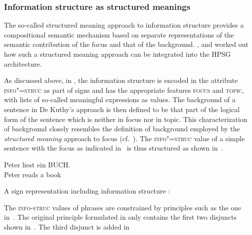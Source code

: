 \documentclass[output=paper
 	        ,biblatex
                ,babelshorthands
                ,newtxmath
                ,draftmode
                ,colorlinks, citecolor=brown
]{langscibook}
\begin{document}
\subsubsection{Information structure as structured meanings \citep{deKuthy2002a}}
\label{sec:struc-meaning}
The so-called structured meaning approach to information structure
\citep{Stechow81a-u,Jacobs83a,Krifka92a-u-kopiert} provides a
compositional semantic mechanism based on separate representations of
the semantic contribution of the focus and that of the
background. \citet{deKuthy2002a}, \cite{dKM2003a} and
\cite{Webelhuth2007a-u} worked out how such a structured meaning
approach can be integrated into the HPSG architecture.

As discussed above, in \cite{deKuthy2002a}, the information structure
is encoded in the attribute \textsc{info"=struc} as part of signs and
has the appropriate features \textsc{focus} and \textsc{topic}, with
lists of so-called meaningful expressions as values. The background of
a sentence in De Kuthy's approach is then defined to be that part of
the logical form of the sentence which is neither in focus nor in
topic.  This characterization of background closely resembles the
definition of background employed by the \textit{structured meaning}
approach to focus (cf.\ \citealt{Krifka92a-u-kopiert}).  The
\textsc{info"=struc} value of a simple sentence with the focus as
indicated in~ is thus structured as shown
in~.
\begin{exe}
  \ex\label{ex:peter} \gll Peter {\LF}liest ein BUCH{\RF}.\\
           Peter {\hphantom{\LF}}reads a book\\
\end{exe}
\ea
 A sign representation including information structure \citep[163]{deKuthy2002a}:
\begin{center}

    \label{fig:focus-backgr}
  \end{center}\unskip
\z
The \textsc{info-struc} values of phrases are constrained by
principles such as the one in~. The
original principle formulated in \cite[169]{deKuthy2002a} only
contains the first two disjuncts shown
in~. The third disjunct is added in
\end{document}
